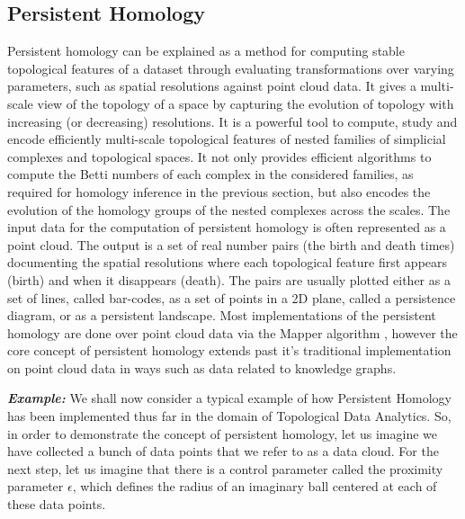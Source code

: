 \subsection{Persistent Homology}
Persistent homology \cite{03.3_de2007PersistentHomology} \cite{03_1944Homology} \cite{03.3_de2007PersistentHomology} can be explained as a method for computing stable topological features of a dataset through evaluating transformations over varying parameters, such as spatial resolutions against point cloud data. It gives a multi-scale view of the topology of a space by capturing the evolution of topology with increasing (or decreasing) resolutions. It  is a powerful tool to compute, study and encode efficiently multi-scale topological features of nested families of simplicial complexes and topological spaces. It not only provides efficient algorithms to compute the Betti numbers of each complex in the considered families, as required for homology inference in the previous section, but also encodes the evolution of the homology groups of the nested complexes across the scales.\cite{03.7_2018homologicalAlgebra&Data}
The input data for the computation of persistent homology is often represented as a point cloud. The output is a set of real number pairs (the birth and death times) documenting the spatial resolutions where each topological feature first appears (birth) and when it disappears (death). The pairs are usually plotted either as a set of lines, called bar-codes, as a set of points in a 2D plane, called a persistence diagram, or as a persistent landscape. Most implementations of the persistent homology are done over point cloud data via the Mapper algorithm \cite{01.9_2007MapperPBG}, however the core concept of persistent homology extends past it's traditional implementation on point cloud data in ways such as data related to knowledge graphs.\cite{01.1_1stCourse2018algebraicTopo}\cite{03.2_2008FindingHomology}

\textbf{\textit{Example:}}  We shall now consider a typical example of how Persistent  Homology has been implemented thus far in the domain of Topological Data Analytics. So, in order to demonstrate the concept of  persistent homology, let us imagine we have collected a bunch of data points that we refer to as a data cloud. For the next step, let us imagine that there is a control parameter called the proximity parameter $\epsilon$, which defines the radius of an imaginary ball centered at each of these data points.\cite{01_GCarlssonEpstein2011} \cite{02.1_GCarlson2004topoEstimation}\cite{03.6_2015persistentHomo}

